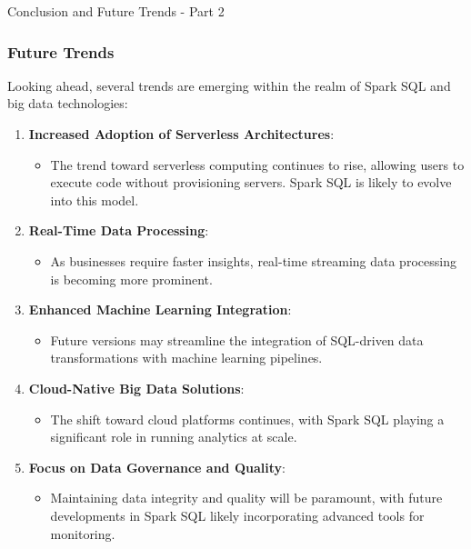 \documentclass[aspectratio=169]{beamer}
\begin{document}
\begin{frame}[fragile]{Conclusion and Future Trends - Part 2}
    \frametitle{Future Trends}
    Looking ahead, several trends are emerging within the realm of Spark SQL and big data technologies:
    
    \begin{enumerate}
        \item \textbf{Increased Adoption of Serverless Architectures}:
        \begin{itemize}
            \item The trend toward serverless computing continues to rise, allowing users to execute code without provisioning servers. Spark SQL is likely to evolve into this model.
        \end{itemize}
        
        \item \textbf{Real-Time Data Processing}:
        \begin{itemize}
            \item As businesses require faster insights, real-time streaming data processing is becoming more prominent.
        \end{itemize}
        
        \item \textbf{Enhanced Machine Learning Integration}:
        \begin{itemize}
            \item Future versions may streamline the integration of SQL-driven data transformations with machine learning pipelines.
        \end{itemize}
        
        \item \textbf{Cloud-Native Big Data Solutions}:
        \begin{itemize}
            \item The shift toward cloud platforms continues, with Spark SQL playing a significant role in running analytics at scale.
        \end{itemize}
        
        \item \textbf{Focus on Data Governance and Quality}:
        \begin{itemize}
            \item Maintaining data integrity and quality will be paramount, with future developments in Spark SQL likely incorporating advanced tools for monitoring.
        \end{itemize}
    \end{enumerate}
\end{frame}
\end{document}
